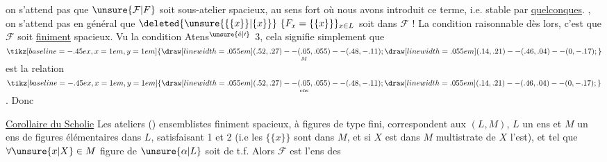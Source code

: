 on s'attend pas  que $\unsure{\mathcal F|F}$ soit  sous-atelier
spacieux, au sens  fort où nous
avons introduit ce terme, i.e. stable par
 \uline{quelconques}. ,  on s'attend
pas en général que $\deleted{\unsure{\{\{x\}\}|\{x\}}}\ \{F_x=\{\{x\}\}\}_{x\in L}$
soit dans $\mathcal F$ ! La condition raisonnable
dès lors, c'est que $\mathcal F$ soit \uline{finiment}
spacieux. Vu la condition Atens${}^{\unsure{\text{é}|\prime}}$ 3,
cela signifie simplement  que
  $\underset{M}{\mathrel{\tikz[baseline=-.45ex,x=1em,y=1em]{\draw[line width=.055em] (.52,.27)--(.05,.055)--(.48,-.11); \draw[line width=.055em] (.14,.21)--(.46,.04)--(0,-.17);}}}$ est la relation
$\underset{\mathrm{ens}}{\mathrel{\tikz[baseline=-.45ex,x=1em,y=1em]{\draw[line width=.055em] (.52,.27)--(.05,.055)--(.48,-.11); \draw[line width=.055em] (.14,.21)--(.46,.04)--(0,-.17);}}}$ . Donc

\uline{Corollaire du Scholie} Les ateliers ()
ensemblistes finiment spacieux,
à figures de type fini, correspondent
aux $(L,M)$, $L$ un ens et $M$
un ens de figures élémentaires dans $L$,
satisfaisant \uline{} 1 et \uline{} 2
(i.e les $\{\{x\}\}$ sont dans $M$, et si $X$ est
dans $M$  multistrate de $X$ l'est),
et tel que $\forall \unsure{x|X}\in M$   figure
de $\unsure{\alpha|L}$ soit de t.f. Alors $\mathcal F$ est l'ens des
